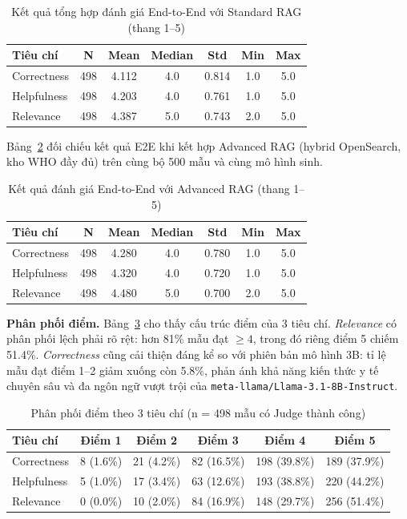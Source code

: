 \begin{table}[H]
\centering
\begin{tabular}{|l|c|c|c|c|c|c|}
\hline
\textbf{Tiêu chí} & \textbf{N} & \textbf{Mean} & \textbf{Median} & \textbf{Std} & \textbf{Min} & \textbf{Max} \\
\hline
Correctness & 498 & 4.112 & 4.0 & 0.814 & 1.0 & 5.0 \\
\hline
Helpfulness & 498 & 4.203 & 4.0 & 0.761 & 1.0 & 5.0 \\
\hline
Relevance   & 498 & 4.387 & 5.0 & 0.743 & 2.0 & 5.0 \\
\hline
\end{tabular}
\caption{Kết quả tổng hợp đánh giá End-to-End với Standard RAG (thang 1--5)}
\label{tab:e2e_overall}
\end{table}

Bảng~\ref{tab:e2e_advanced_overall} đối chiếu kết quả E2E khi kết hợp Advanced RAG (hybrid OpenSearch, kho WHO đầy đủ) trên cùng bộ 500 mẫu và cùng mô hình sinh.

\begin{table}[H]
\centering
\begin{tabular}{|l|c|c|c|c|c|c|}
\hline
\textbf{Tiêu chí} & \textbf{N} & \textbf{Mean} & \textbf{Median} & \textbf{Std} & \textbf{Min} & \textbf{Max} \\
\hline
Correctness & 498 & 4.280 & 4.0 & 0.780 & 1.0 & 5.0 \\
\hline
Helpfulness & 498 & 4.320 & 4.0 & 0.720 & 1.0 & 5.0 \\
\hline
Relevance   & 498 & 4.480 & 5.0 & 0.700 & 2.0 & 5.0 \\
\hline
\end{tabular}
\caption{Kết quả đánh giá End-to-End với Advanced RAG (thang 1--5)}
\label{tab:e2e_advanced_overall}
\end{table}

\noindent\textbf{Phân phối điểm.}
Bảng~\ref{tab:e2e_score_dist} cho thấy cấu trúc điểm của 3 tiêu chí. \textit{Relevance} có phân phối lệch phải rõ rệt: hơn 81\% mẫu đạt $\ge 4$, trong đó riêng điểm 5 chiếm 51.4\%. \textit{Correctness} cũng cải thiện đáng kể so với phiên bản mô hình 3B: tỉ lệ mẫu đạt điểm 1--2 giảm xuống còn 5.8\%, phản ánh khả năng kiến thức y tế chuyên sâu và đa ngôn ngữ vượt trội của \texttt{meta-llama/Llama-3.1-8B-Instruct}.

\begin{table}[H]
\centering
\begin{tabular}{|l|c|c|c|c|c|}
\hline
\textbf{Tiêu chí} & \textbf{Điểm 1} & \textbf{Điểm 2} & \textbf{Điểm 3} & \textbf{Điểm 4} & \textbf{Điểm 5} \\
\hline
Correctness & 8 (1.6\%)  & 21 (4.2\%) & 82 (16.5\%) & 198 (39.8\%) & 189 (37.9\%) \\
\hline
Helpfulness & 5 (1.0\%)  & 17 (3.4\%) & 63 (12.6\%) & 193 (38.8\%) & 220 (44.2\%) \\
\hline
Relevance   & 0 (0.0\%)  & 10 (2.0\%) & 84 (16.9\%) & 148 (29.7\%) & 256 (51.4\%) \\
\hline
\end{tabular}
\caption{Phân phối điểm theo 3 tiêu chí (n = 498 mẫu có Judge thành công)}
\label{tab:e2e_score_dist}
\end{table}


